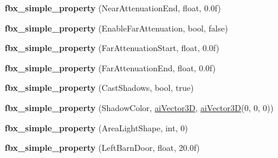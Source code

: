 \begin{DoxyCompactItemize}
\item 
\hypertarget{class_assimp_1_1_f_b_x_1_1_light_a9af20123316d14393aa915cff11ccc5f}{{\bfseries fbx\+\_\+simple\+\_\+property} (Near\+Attenuation\+End, float, 0.\+0f)}\label{class_assimp_1_1_f_b_x_1_1_light_a9af20123316d14393aa915cff11ccc5f}

\item 
\hypertarget{class_assimp_1_1_f_b_x_1_1_light_a063f472f2dcff72312bf3a98bb93bced}{{\bfseries fbx\+\_\+simple\+\_\+property} (Enable\+Far\+Attenuation, bool, false)}\label{class_assimp_1_1_f_b_x_1_1_light_a063f472f2dcff72312bf3a98bb93bced}

\item 
\hypertarget{class_assimp_1_1_f_b_x_1_1_light_a791e11476d99a1ab708fa2c718dd7e35}{{\bfseries fbx\+\_\+simple\+\_\+property} (Far\+Attenuation\+Start, float, 0.\+0f)}\label{class_assimp_1_1_f_b_x_1_1_light_a791e11476d99a1ab708fa2c718dd7e35}

\item 
\hypertarget{class_assimp_1_1_f_b_x_1_1_light_ac7704153dac0a5d76cdd27d82593cb7e}{{\bfseries fbx\+\_\+simple\+\_\+property} (Far\+Attenuation\+End, float, 0.\+0f)}\label{class_assimp_1_1_f_b_x_1_1_light_ac7704153dac0a5d76cdd27d82593cb7e}

\item 
\hypertarget{class_assimp_1_1_f_b_x_1_1_light_aa6ab857fdeb07aac562ebd1ba9b4fb7f}{{\bfseries fbx\+\_\+simple\+\_\+property} (Cast\+Shadows, bool, true)}\label{class_assimp_1_1_f_b_x_1_1_light_aa6ab857fdeb07aac562ebd1ba9b4fb7f}

\item 
\hypertarget{class_assimp_1_1_f_b_x_1_1_light_a83896e740db6a8b1361ebbf641ce10c0}{{\bfseries fbx\+\_\+simple\+\_\+property} (Shadow\+Color, \hyperlink{structai_vector3_d}{ai\+Vector3\+D}, \hyperlink{structai_vector3_d}{ai\+Vector3\+D}(0, 0, 0))}\label{class_assimp_1_1_f_b_x_1_1_light_a83896e740db6a8b1361ebbf641ce10c0}

\item 
\hypertarget{class_assimp_1_1_f_b_x_1_1_light_aef04893087578086984d288d11ee2b11}{{\bfseries fbx\+\_\+simple\+\_\+property} (Area\+Light\+Shape, int, 0)}\label{class_assimp_1_1_f_b_x_1_1_light_aef04893087578086984d288d11ee2b11}

\item 
\hypertarget{class_assimp_1_1_f_b_x_1_1_light_ade32da0a6c5d8e12c48da32d632665c9}{{\bfseries fbx\+\_\+simple\+\_\+property} (Left\+Barn\+Door, float, 20.\+0f)}\label{class_assimp_1_1_f_b_x_1_1_light_ade32da0a6c5d8e12c48da32d632665c9}


\end{DoxyCompactItemize}
